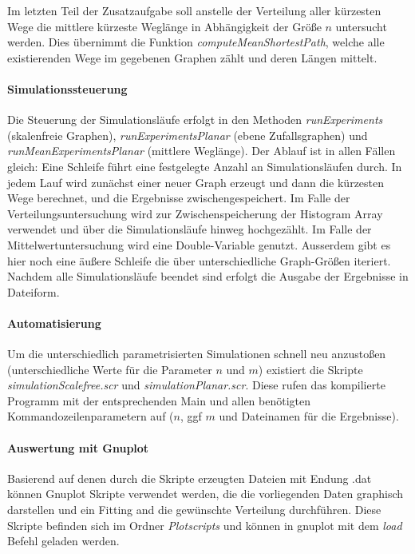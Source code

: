 \documentclass[10pt]{article}
\begin{document}
Im letzten Teil der Zusatzaufgabe soll anstelle der Verteilung aller kürzesten Wege die mittlere kürzeste Weglänge in Abhängigkeit der Größe $n$ untersucht werden. Dies übernimmt die Funktion \textit{computeMeanShortestPath}, welche alle existierenden Wege im gegebenen Graphen zählt und deren Längen mittelt.

\paragraph{Simulationssteuerung}
Die Steuerung der Simulationsläufe erfolgt in den Methoden \textit{runExperiments} (skalenfreie Graphen), \textit{runExperimentsPlanar} (ebene Zufallsgraphen) und \textit{runMeanExperimentsPlanar} (mittlere Weglänge). Der Ablauf ist in allen Fällen gleich: Eine Schleife führt eine festgelegte Anzahl an Simulationsläufen durch. In jedem Lauf wird zunächst einer neuer Graph erzeugt und dann die kürzesten Wege berechnet, und die Ergebnisse zwischengespeichert. Im Falle der Verteilungsuntersuchung wird zur Zwischenspeicherung der Histogram Array verwendet und über die Simulationsläufe hinweg hochgezählt. Im Falle der Mittelwertuntersuchung wird eine Double-Variable genutzt. Ausserdem gibt es hier noch eine äußere Schleife die über unterschiedliche Graph-Größen iteriert. Nachdem alle Simulationsläufe beendet sind erfolgt die Ausgabe der Ergebnisse in Dateiform.

\paragraph{Automatisierung}
Um die unterschiedlich parametrisierten Simulationen schnell neu anzustoßen (unterschiedliche Werte für die Parameter $n$ und $m$) existiert die Skripte \textit{simulationScalefree.scr} und \textit{simulationPlanar.scr}. Diese rufen das kompilierte Programm mit der entsprechenden Main und allen benötigten Kommandozeilenparametern auf ($n$, ggf $m$ und Dateinamen für die Ergebnisse).

\paragraph{Auswertung mit Gnuplot}
Basierend auf denen durch die Skripte erzeugten Dateien mit Endung .dat können Gnuplot Skripte verwendet werden, die die vorliegenden Daten graphisch darstellen und ein Fitting and die gewünschte Verteilung durchführen. Diese Skripte befinden sich im Ordner \textit{Plotscripts} und können in gnuplot mit dem \textit{load} Befehl geladen werden.
\end{document}
